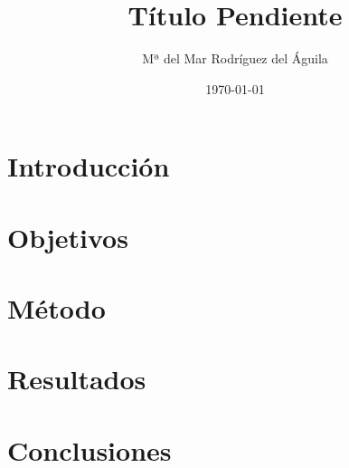 \documentclass[11pt, a4paper]{article}
\begin{document}
\sffamily

\title{Título Pendiente}

\author{Mª del Mar Rodríguez del Águila}

\date{\today}

\maketitle

\tableofcontents

\begin{abstract}
 


\end{abstract}

\section{Introducción}



\section{Objetivos}


\section{Método}


\section{Resultados}


\section{Conclusiones}
\end{document}
